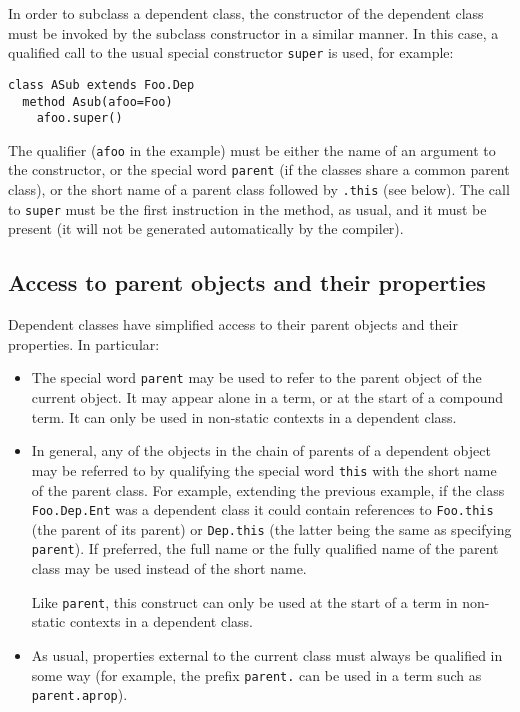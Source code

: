 In order to subclass a dependent class, the constructor of the dependent
class must be invoked by the subclass constructor in a similar manner.
In this case, a qualified call to the usual special
constructor \texttt{super} is used, for example:
\begin{lstlisting}
class ASub extends Foo.Dep
  method Asub(afoo=Foo)
    afoo.super()
\end{lstlisting}
 The qualifier (\texttt{afoo} in the example) must be either the name of
an argument to the constructor, or the special word \texttt{parent} (if
the classes share a common parent class), or the short name of a parent
class followed by \texttt{.this} (see below).
The call to \texttt{super} must be the first instruction in the method, as
usual, and it must be present (it will not be generated automatically by
the compiler).
\subsection{Access to parent objects and their properties}
 
Dependent classes have simplified access to their parent objects and
their properties.
In particular:
\begin{itemize}
\item The special word \texttt{parent} may be used to refer to the
parent object of the current object.  It may appear alone in a term, or
at the start of a compound term.
It can only be used in non-static contexts in a dependent class.
\item 
{}
In general, any of the objects in the chain of parents of a dependent
object may be referred to by qualifying the special word \texttt{this}
with the short name of the parent class.
For example, extending the previous example, if the
class \texttt{Foo.Dep.Ent} was a dependent class it could contain
references to \texttt{Foo.this} (the parent of its parent)
or \texttt{Dep.this} (the latter being the same as
specifying \texttt{parent}).  If preferred, the full name or the fully
qualified name of the parent class may be used instead of the short
name.
 
Like \texttt{parent}, this construct can only be used at the start of a
term in non-static contexts in a dependent class.
\item 
{}
As usual, properties external to the current class must always be
qualified in some way (for example, the prefix \texttt{parent.} can be
used in a term such as \texttt{parent.aprop}).
\end{itemize}
